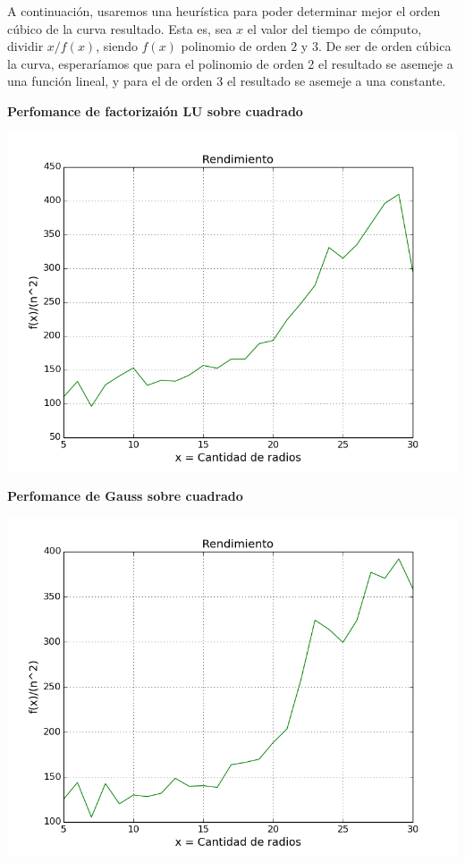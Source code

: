 A continuaci\'on, usaremos una heur\'istica para poder determinar mejor el orden c\'ubico de la curva resultado. Esta es, sea $x$ el valor del tiempo de c\'omputo, dividir $x/f(x)$, siendo $f(x)$ polinomio de orden $2$ y $3$. De ser de orden c\'ubica la curva, esperar\'iamos que para el polinomio de orden 2 el resultado se asemeje a una funci\'on lineal, y para el de orden 3 el resultado se asemeje a una constante.

  	\textbf{Perfomance de factorizai\'on LU sobre cuadrado}\\

\begin{center}
\includegraphics[scale=0.65]{experimentos2a_2b/Lucuadrado.png}
\end{center}

  	\textbf{Perfomance de Gauss sobre cuadrado}\\

\begin{center}
\includegraphics[scale=0.65]{experimentos2a_2b/GaussCuadrado.png}
\end{center}

